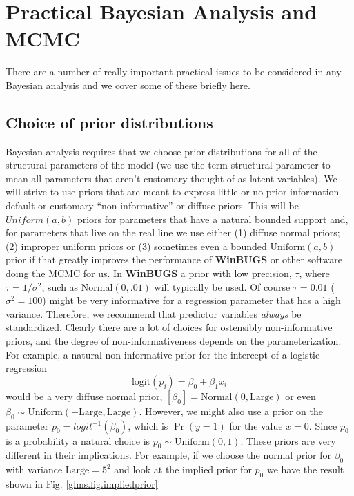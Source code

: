 \section{Practical Bayesian Analysis and MCMC}

There are a number of really important practical issues to be
considered in any Bayesian analysis and we cover some of these briefly
here.

\subsection{Choice of prior distributions}

Bayesian analysis requires that we choose prior
distributions for all of the structural parameters of the model (we
use the term structural parameter to mean all parameters that aren't
customary thought of as latent variables). We will strive to use
priors that are meant to express little or no prior information -
default or customary ``non-informative'' or diffuse priors. This will
be $Uniform(a,b)$ priors for parameters that have a natural
bounded support and, for parameters that live on the real line we use
either (1) diffuse normal priors; (2) improper uniform priors or
(3) sometimes even a bounded $\mbox{Uniform}(a,b)$ prior if that greatly
improves the performance of {\bf WinBUGS} or other software doing the MCMC
for us.  In {\bf WinBUGS} a prior with low precision, $\tau$, where
$\tau = 1/\sigma^2$, such as $\mbox{Normal}(0,.01)$ will typically be
used. Of course $\tau = 0.01$ ($\sigma^{2} = 100$) might be very
informative for a regression parameter that has a high
variance. Therefore, we recommend that predictor variables {\it
  always} be standardized. Clearly there are a lot of choices for
ostensibly non-informative priors, and the degree of
non-informativeness depends on the parameterization. For example, a
natural non-informative prior for the intercept of a logistic
regression
\[
\mbox{logit}(p_{i}) = \beta_0 + \beta_1 x_{i}
\]
would be a very diffuse normal prior,
$[\beta_0] = \mbox{Normal}(0,\mbox{Large})$ or even
 $\beta_0 \sim
\mbox{Uniform}(-\mbox{Large},\mbox{Large})$.
However, we might also use a prior on the parameter $p_0
= logit^{-1}(\beta_0)$, which is $\Pr(y=1)$ for the value $x=0$. 
Since $p_0$ is a
probability a natural choice is $p_0 \sim \mbox{Uniform}(0,1)$. 
These priors are very different in their implications. For example, if
we choose the normal prior for $\beta_0$ with variance
$\mbox{Large} = 5^2$ and look at the implied prior for $p_{0}$
we have the result shown in Fig. \ref{glms.fig.impliedprior}
